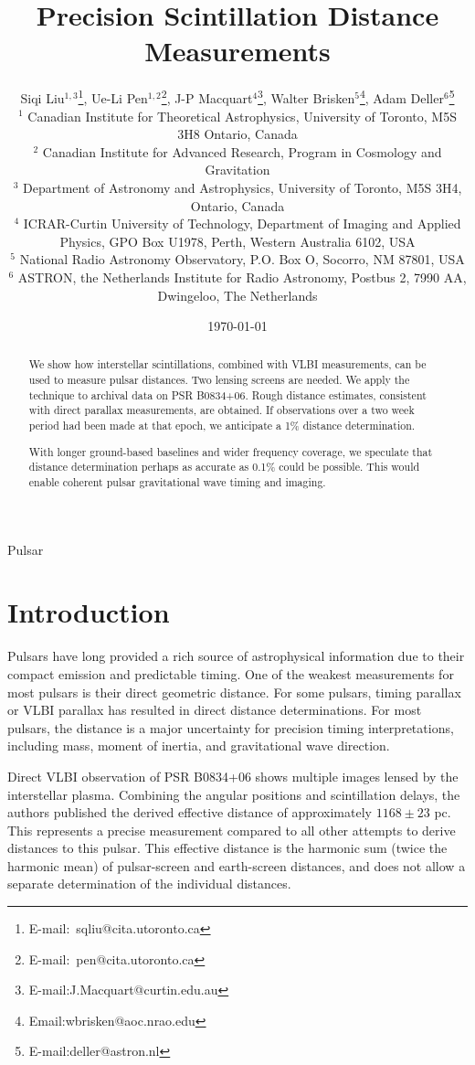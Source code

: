 \documentclass[useAMS,usenatbib]{mn2e}
\title[Lensing Distance]{
Precision Scintillation Distance Measurements
}
\author[Liu et al]{Siqi Liu$^{1,3}$\thanks{E-mail:\ sqliu@cita.utoronto.ca}, Ue-Li
  Pen$^{1,2}$\thanks{E-mail:\ pen@cita.utoronto.ca}, J-P Macquart$^{4}$\thanks{E-mail:J.Macquart@curtin.edu.au},
  Walter Brisken$^{5}$\thanks{Email:wbrisken@aoc.nrao.edu}, Adam Deller$^{6}$\thanks{E-mail:deller@astron.nl}\\
 $^1$ Canadian Institute for Theoretical Astrophysics, University of Toronto, M5S 3H8 Ontario, Canada \\
$^2$ Canadian Institute for Advanced Research, Program in Cosmology
and Gravitation\\
$^3$ Department of Astronomy and Astrophysics, University of Toronto, M5S 3H4, Ontario, Canada\\
$^4$ ICRAR-Curtin University of Technology, Department of Imaging and Applied Physics, GPO Box U1978, Perth, Western Australia 6102, USA \\
$^5$ National Radio Astronomy Observatory, P.O. Box O, Socorro, NM 87801, USA\\
$^6$ ASTRON, the Netherlands Institute for Radio Astronomy, Postbus 2, 7990 AA, Dwingeloo, The Netherlands\\
}
\begin{document}
\date{\today}

\pagerange{\pageref{firstpage}--\pageref{lastpage}} 

\maketitle
\label{firstpage}
\begin{abstract}
We show how interstellar scintillations, combined with VLBI
measurements, can be used to measure pulsar distances.  Two lensing
screens are needed.  We apply the technique to archival data on PSR
B0834+06.  Rough distance estimates, consistent with direct parallax
measurements, are obtained.  If observations over a two week period
had been made at that epoch, we anticipate a 1\% distance
determination.   

With longer ground-based baselines and wider frequency coverage, we
speculate that distance determination perhaps as accurate as 0.1\%
could be possible. This would enable coherent pulsar gravitational
wave timing and imaging.
\end{abstract}
\begin{keywords}
Pulsar
\end{keywords}

\newcommand{\be}{\begin{eqnarray}}
\newcommand{\ee}{\end{eqnarray}}
\newcommand{\beq}{\begin{equation}}
\newcommand{\eeq}{\end{equation}}

\section{Introduction}

Pulsars have long provided a rich source of astrophysical information
due to their compact emission and predictable timing.   One of the
weakest measurements for most pulsars is their direct geometric
distance.  For some pulsars, timing parallax or VLBI parallax has
resulted in direct distance determinations.  For most pulsars, the
distance is a major uncertainty for precision timing interpretations,
including mass, moment of inertia, and gravitational wave
direction\citep{boyle2012}.

Direct VLBI observation of PSR B0834+06 shows multiple images lensed
by the interstellar plasma.  Combining the angular positions and
scintillation delays, the authors published the derived effective
distance\citep{2010ApJ...708..232B} of approximately $1168\pm 23$ pc.
This represents a precise measurement compared to all other attempts
to derive distances to this pulsar.  This effective distance is the
harmonic sum (twice the harmonic mean) of pulsar-screen and
earth-screen distances, and does not allow a separate determination of
the individual distances.
\end{document}
